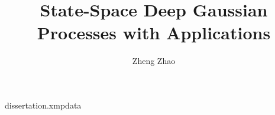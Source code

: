 \RequirePackage{filecontents}
\begin{filecontents*}{dissertation.xmpdata}
\end{filecontents*}

\documentclass[dissertation,final,vertlayout,pdfa,nologo,math]{aaltoseries}

\makeatletter
{}
\makeatother

\hypersetup{bookmarks=true, colorlinks=false, pagebackref=true, hypertexnames=true, hidelinks}

\usepackage[hyperpageref]{backref}
\renewcommand*{\backref}[1]{}
\renewcommand*{\backrefalt}[4]{{
		\ifcase #1 Not cited.%
		\or Cited on page~#2.%
		\else Cited on pages #2.%
		\fi%
	}}

\usepackage[english]{babel}
\usepackage{amsmath,amsthm,amssymb,bm}
\renewcommand*{\arraystretch}{1.2}
\setlength{\jot}{8pt}

\usepackage{emptypage}

\usepackage[SchoolofEngineering]{aaltologo}

\usepackage{CJKutf8}
\usepackage[round, authoryear]{natbib}
\usepackage{graphicx}
\usepackage{mathtools}
\usepackage[shortlabels]{enumitem}

\usepackage{tikz}
\usetikzlibrary{fadings}
\usetikzlibrary{patterns}
\usetikzlibrary{shadows.blur}
\usetikzlibrary{shapes}

\newcommand{\thmenvcounter}{chapter}


\newcommand{\zz}[1]{{\color{red} #1}}

\newcommand*{\hilite}[1]{
\setlength{\fboxsep}{3mm}%
\begin{center}\colorbox{orange}{\parbox{0.9\columnwidth}{\textit{#1}}}\end{center}%
}

\author{Zheng Zhao}
\title{State-Space Deep Gaussian Processes with Applications}



